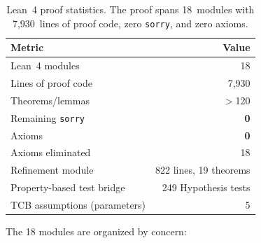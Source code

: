 \documentclass[sigplan,10pt,manuscript,review,anonymous]{acmart}
\begin{document}
\begin{table}[t]
\centering
\caption{Lean~4 proof statistics. The proof spans 18~modules with
         7{,}930~lines of proof code, zero \texttt{sorry}, and zero
         axioms.}
\label{tab:proofstats}
\begin{tabular}{lr}
\toprule
\textbf{Metric} & \textbf{Value} \\
\midrule
Lean~4 modules & 18 \\
Lines of proof code & 7{,}930 \\
Theorems/lemmas & $>$120 \\
Remaining \texttt{sorry} & \textbf{0} \\
Axioms & \textbf{0} \\
Axioms eliminated & 18 \\
Refinement module & 822 lines, 19 theorems \\
Property-based test bridge & 249 Hypothesis tests \\
TCB assumptions (parameters) & 5 \\
\bottomrule
\end{tabular}
\end{table}

The 18 modules are organized by concern:
\end{document}
